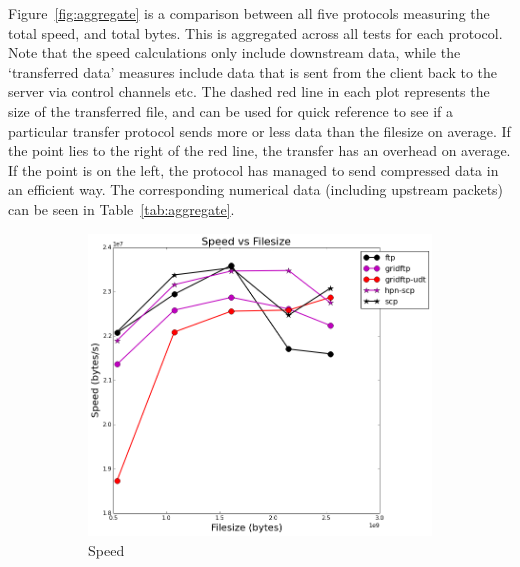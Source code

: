 \documentclass{sig-alternate-05-2015}
\begin{document}
Figure~\ref{fig:aggregate} is a comparison between all five protocols measuring the total speed, and total bytes. This is aggregated across all tests for each protocol. Note that the speed calculations only include downstream data, while the `transferred data' measures include data that is sent from the client back to the server via control channels etc. The dashed red line in each plot represents the size of the transferred file, and can be used for quick reference to see if a particular transfer protocol sends more or less data than the filesize on average. If the point lies to the right of the red line, the transfer has an overhead on average. If the point is on the left, the protocol has managed to send compressed data in an efficient way.
The corresponding numerical data (including upstream packets) can be seen in Table~\ref{tab:aggregate}.
\begin{figure}
\centering
	\begin{subfigure}{.45\textwidth}
	\includegraphics[width=\textwidth]{img/per_filesize/speed.png}
	\caption{Speed}
	\label{fig:per_fs_speed}
	\end{subfigure}
	\begin{subfigure}{.45\textwidth}

\end{subfigure}
\end{figure}
\end{document}
